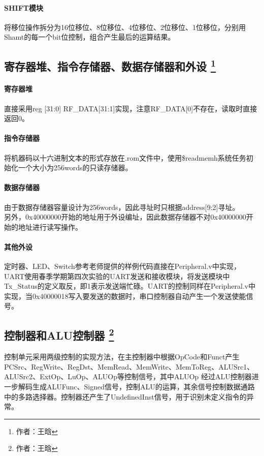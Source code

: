 \documentclass{article}
\begin{document}
            \paragraph*{SHIFT模块}
            将移位操作拆分为16位移位、8位移位、4位移位、2位移位、1位移位，分别用Shamt的每一个bit位控制，组合产生最后的运算结果。
            
        \subsection{寄存器堆、指令存储器、数据存储器和外设 \protect\footnote{作者：王晗}}
            \paragraph*{寄存器堆}
                直接采用reg [31:0] RF\_DATA[31:1]实现，注意RF\_DATA[0]不存在，读取时直接返回0。
            \paragraph*{指令存储器}
                将机器码以十六进制文本的形式存放在.rom文件中，使用\$readmemh系统任务初始化一个大小为256words的只读存储器。
            \paragraph*{数据存储器}
                由于数据存储器容量设计为256words，因此寻址时只根据address[9:2]寻址。 \\ 
                另外，0x40000000开始的地址用于外设编址，因此数据存储器不对0x40000000开始的地址进行读写操作。
            \paragraph*{其他外设}   
                定时器、LED、Switch参考老师提供的样例代码直接在Peripheral.v中实现，UART使用春季学期第四次实验的UART发送和接收模块，将发送模块中Tx\_Status的定义取反，即1表示发送端忙碌。UART的控制同样在Peripheral.v中实现，当0x40000018写入要发送的数据时，串口控制器自动产生一个发送使能信号。
                
        \subsection{控制器和ALU控制器 \protect\footnote{作者：王晗}}
            控制单元采用两级控制的实现方法，在主控制器中根据OpCode和Funct产生PCSrc、RegWrite、RegDst、MemRead、MemWrite、MemToReg、ALUSrc1、ALUSrc2、ExtOp、LuOp、ALUOp等控制信号，其中ALUOp 经过ALU控制器进一步解码生成ALUFunc、Signed信号，控制ALU的运算，其余信号控制数据通路中的多路选择器。控制器还产生了UndefinedInst信号，用于识别未定义指令的异常。
           
\end{document}
